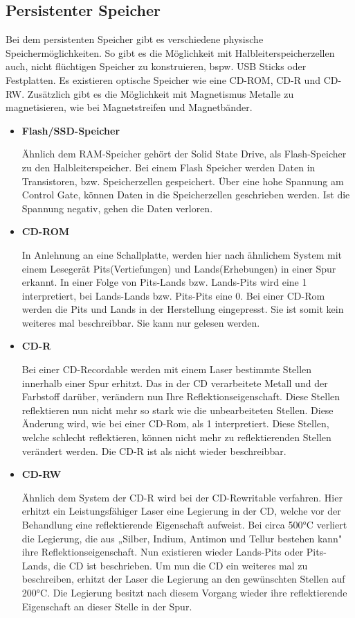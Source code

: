 \documentclass[10pt,a4paper]{article} %
\begin{document}
\subsection{Persistenter Speicher}
Bei dem persistenten Speicher gibt es verschiedene physische Speichermöglichkeiten. So gibt es die Möglichkeit mit Halbleiterspeicherzellen auch, nicht flüchtigen Speicher zu konstruieren, bspw. USB Sticks oder Festplatten. Es existieren optische Speicher wie eine CD-ROM, CD-R und CD-RW. Zusätzlich gibt es die Möglichkeit mit Magnetismus Metalle zu magnetisieren, wie bei Magnetstreifen und Magnetbänder.
\begin{itemize}

\item \textbf{Flash/SSD-Speicher}

Ähnlich dem RAM-Speicher gehört der Solid State Drive, als Flash-Speicher zu den Halbleiterspeicher. Bei einem Flash Speicher werden Daten in Transistoren, bzw. Speicherzellen gespeichert. Über eine hohe Spannung am Control Gate, können Daten in die Speicherzellen geschrieben werden. Ist die Spannung negativ, gehen die Daten verloren. \cite[6]{FSP}

\item
\textbf{CD-ROM}

In Anlehnung an eine Schallplatte, werden hier nach ähnlichem System mit einem Lesegerät Pits(Vertiefungen) und Lands(Erhebungen) in einer Spur erkannt. In einer Folge von Pits-Lands bzw. Lands-Pits wird eine 1 interpretiert, bei Lands-Lands bzw. Pits-Pits eine 0. Bei einer CD-Rom werden die Pits und Lands in der Herstellung eingepresst. Sie ist somit kein weiteres mal beschreibbar. Sie kann nur gelesen werden. \cite{CD}\cite[Kapitel 10:10]{ESP}

\item \textbf{CD-R}

Bei einer CD-Recordable werden mit einem Laser bestimmte Stellen innerhalb einer Spur erhitzt. Das in der CD verarbeitete Metall und der Farbstoff darüber, verändern nun Ihre Reflektionseigenschaft. Diese Stellen reflektieren nun nicht mehr so stark wie die unbearbeiteten Stellen. Diese Änderung wird, wie bei einer CD-Rom, als 1 interpretiert. Diese Stellen, welche schlecht reflektieren, können nicht mehr zu reflektierenden Stellen  verändert werden. Die CD-R ist als nicht wieder beschreibbar. \cite{CD}\cite[Kapitel 10:10]{ESP}

\item \textbf{CD-RW}

Ähnlich dem System der CD-R wird bei der CD-Rewritable verfahren. Hier erhitzt ein Leistungsfähiger Laser eine Legierung in der CD, welche vor der Behandlung eine reflektierende Eigenschaft aufweist. Bei circa 500°C verliert die Legierung, die aus „Silber, Indium, Antimon und Tellur bestehen kann" \cite{CD} ihre Reflektionseigenschaft. Nun existieren wieder Lands-Pits oder Pits-Lands, die CD ist beschrieben. Um nun die CD ein weiteres mal zu beschreiben, erhitzt der Laser die Legierung an den gewünschten Stellen auf 200°C. Die Legierung besitzt nach diesem Vorgang wieder ihre reflektierende Eigenschaft an dieser Stelle in der Spur. \cite{CD}\cite[Kapitel 10:10]{ESP}


\end{itemize}
\end{document}
